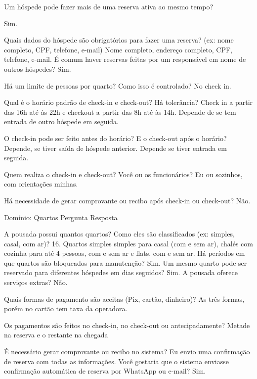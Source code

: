 	Um hóspede pode fazer mais de uma reserva ativa ao mesmo tempo?
	

Sim.


	Quais dados do hóspede são obrigatórios para fazer uma reserva? (ex: nome completo, CPF, telefone, e-mail)
	Nome completo, endereço completo,  CPF, telefone, e-mail.
	É comum haver reservas feitas por um responsável em nome de outros hóspedes?
	Sim.


	Há um limite de pessoas por quarto? Como isso é controlado?
	No check in.


	 


Qual é o horário padrão de check-in e check-out? Há tolerância?
	 Check in a partir das 16h até às 22h e checkout a partir das 8h até às 14h.  Depende de se tem entrada de outro hóspede em seguida.
	



O check-in pode ser feito antes do horário? E o check-out após o horário?
	Depende, se tiver saída de hóspede anterior.  Depende se tiver entrada em seguida.


	

Quem realiza o check-in e check-out? Você ou os funcionários?
	Eu ou sozinhos, com orientações minhas. 


	Há necessidade de gerar comprovante ou recibo após check-in ou check-out?
	Não.


	Domínio: Quartos
	Pergunta
	Resposta
	



A pousada possui quantos quartos? Como eles são classificados (ex: simples, casal, com ar)?
	16. Quartos simples simples para casal (com e sem ar), chalés com cozinha para até 4 pessoas, com e sem ar e flats, com e sem ar. 
	Há períodos em que quartos são bloqueados para manutenção?
	Sim.
	Um mesmo quarto pode ser reservado para diferentes hóspedes em dias seguidos?
	Sim.
	A pousada oferece serviços extras? 
	Não. 
	

Quais formas de pagamento são aceitas (Pix, cartão, dinheiro)?
	As três formas, porém no cartão tem taxa da operadora. 
	

Os pagamentos são feitos no check-in, no check-out ou antecipadamente?
	Metade na reserva e o restante na chegada
	

É necessário gerar comprovante ou recibo no sistema?
	Eu envio uma confirmação de reserva com todas as informações.
	 Você gostaria que o sistema enviasse confirmação automática de reserva por WhatsApp ou e-mail?
	Sim.


